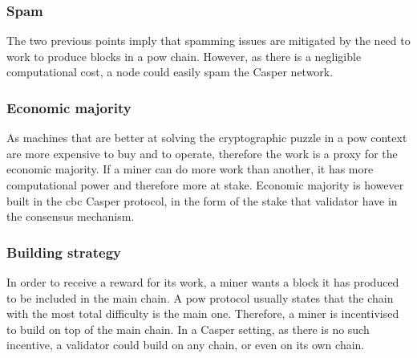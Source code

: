 \subsubsection{Spam}
The two previous points imply that spamming issues are mitigated by the need to
work to produce blocks in a \gls{pow} chain. However, as there is a negligible
computational cost, a node could easily spam the Casper network.

\subsubsection{Economic majority}
As machines that are better at solving the cryptographic puzzle in a \gls{pow}
context are more expensive to buy and to operate, therefore the work is a proxy
for the economic majority. If a miner can do more work than another, it has more
computational power and therefore more at stake.
Economic majority is however built in the \gls{cbc} Casper protocol, in the form
of the stake that validator have in the consensus mechanism.

\subsubsection{Building strategy}
In order to receive a reward for its work, a miner wants a block it has produced
to be included in the main chain. A \gls{pow} protocol usually states that the
chain with the most total difficulty is the main one. Therefore, a miner is
incentivised to build on top of the main chain.
In a Casper setting, as there is no such incentive, a validator could build on
any chain, or even on its own chain.


\begin{table}[H]
\end{table}

